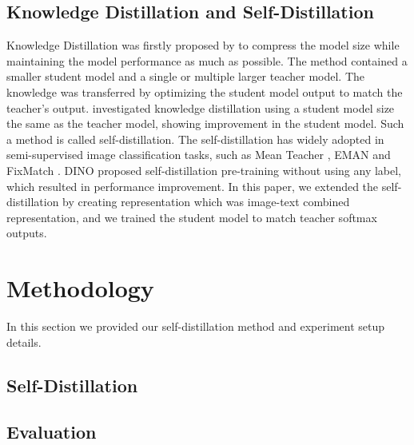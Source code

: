 \documentclass[10pt,twocolumn,letterpaper]{article}
\begin{document}
\subsection{Knowledge Distillation and Self-Distillation}
Knowledge Distillation was firstly proposed by \cite{knowledge_distill} to compress the model size while maintaining the model performance as much as possible.
The method contained a smaller student model and a single or multiple larger teacher model.
The knowledge was transferred by optimizing the student model output to match the teacher's output.
\cite{born_again} investigated knowledge distillation using a student model size the same as the teacher model, showing improvement in the student model.
Such a method is called self-distillation.
The self-distillation has widely adopted in semi-supervised image classification tasks, such as Mean Teacher \cite{mean_teacher}, EMAN \cite{eman} and FixMatch \cite{fixmatch}.
DINO \cite{dino} proposed self-distillation pre-training without using any label, which resulted in performance improvement.
In this paper, we extended the self-distillation by creating representation which was image-text combined representation, and we trained the student model to match teacher softmax outputs.

\section{Methodology}
In this section we provided our self-distillation method and experiment setup details.
\subsection{Self-Distillation}
   
\subsection{Evaluation}


{\small


}
\end{document}
